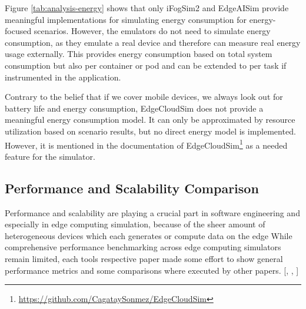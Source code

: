 Figure \ref{tab:analysis-energy} shows that only iFogSim2 and EdgeAISim provide meaningful implementations for simulating energy consumption for energy-focused scenarios.
However, the emulators do not need to simulate energy consumption, as they emulate a real device and therefore can measure real energy usage externally.
This provides energy consumption based on total system consumption but also per container or pod and can be extended to per task if instrumented in the application.

Contrary to the belief that if we cover mobile devices, we always look out for battery life and energy consumption, EdgeCloudSim does not provide a meaningful energy consumption model.
It can only be approximated by resource utilization based on scenario results, but no direct energy model is implemented.
However, it is mentioned in the documentation of EdgeCloudSim\footnote{\url{https://github.com/CagataySonmez/EdgeCloudSim}} as a needed feature for the simulator.

\subsection{Performance and Scalability Comparison}
Performance and scalability are playing a crucial part in software engineering and especially in edge computing simulation, because of the sheer amount of heterogeneous devices which each generates or compute data on the edge
While comprehensive performance benchmarking across edge computing simulators remain limited, each tools respective paper made some effort to show general performance metrics and some comparisons where executed by other papers. [\cite{s23073492}, \cite{MECHALIKH2025103042}, \cite{fi11030055}]

